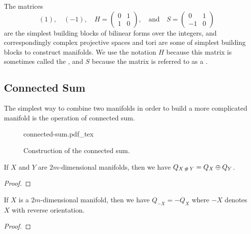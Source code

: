 The matrices 
\[
	(1),\quad (-1),\quad H = \begin{pmatrix} 0 & 1 \\ 1 & 0\end{pmatrix},\quad\textrm{and}\quad S=\begin{pmatrix}0 & 1\\ -1 & 0\end{pmatrix}
\]
are the simplest building blocks of bilinear forms over the integers, and correspondingly complex projective spaces and tori are some of simplest building blocks to construct manifolds. We use the notation $H$ because this matrix is sometimes called the , and $S$ because the matrix is referred to as a . 

\subsection{Connected Sum}

The simplest way to combine two manifolds in order to build a more complicated manifold is the operation of connected sum. 

\begin{definition}
\end{definition}

\begin{figure}[ht]
	\centering
	{connected-sum.pdf_tex}
	\caption{Construction of the connected sum.}\label{fig:connected-sum}
\end{figure}

\begin{proposition}
\end{proposition}

\begin{proposition}\label{prop:connected-sum-intersection-form}
	If $X$ and $Y$ are $2m$-dimensional manifolds, then we have $Q_{X\,\#\,Y} = Q_X\oplus Q_Y$.
\end{proposition}
\begin{proof}
\end{proof}

\begin{proposition}\label{prop:reverse-orientation-intersection-form}
	If $X$ is a $2m$-dimensional manifold, then we have $Q_{-X} = -Q_X$ where $-X$ denotes $X$ with reverse orientation.
\end{proposition}
\begin{proof}
\end{proof}

